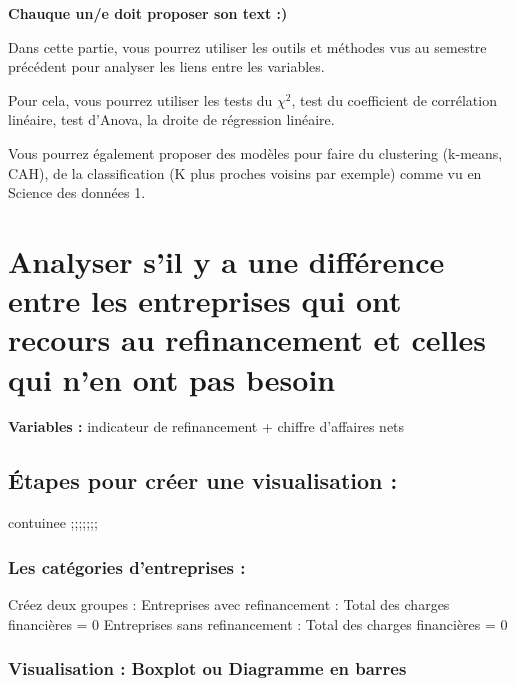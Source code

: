 \documentclass[mstat,12pt]{unswthesis}
\begin{document}
\textbf{Chauque un/e doit proposer son text :) }

Dans cette partie, vous pourrez utiliser les outils et méthodes vus au
semestre précédent pour analyser les liens entre les variables.

Pour cela, vous pourrez utiliser les tests du \(\chi^2\), test du
coefficient de corrélation linéaire, test d'Anova, la droite de
régression linéaire.

Vous pourrez également proposer des modèles pour faire du clustering
(k-means, CAH), de la classification (K plus proches voisins par
exemple) comme vu en Science des données 1.

\newpage

\section{\texorpdfstring{\textbf{Analyser s'il y a une différence entre
les entreprises qui ont recours au refinancement et celles qui n'en ont
pas
besoin}}{Analyser s'il y a une différence entre les entreprises qui ont recours au refinancement et celles qui n'en ont pas besoin}}\label{analyser-sil-y-a-une-diffuxe9rence-entre-les-entreprises-qui-ont-recours-au-refinancement-et-celles-qui-nen-ont-pas-besoin}

\bigskip

\textbf{Variables :} indicateur de refinancement + chiffre d'affaires
nets

\subsection{Étapes pour créer une visualisation
:}\label{uxe9tapes-pour-cruxe9er-une-visualisation-1}

contuinee ;;;;;;;

\subsubsection{Les catégories d'entreprises
:}\label{les-catuxe9gories-dentreprises-1}

\bigskip

Créez deux groupes : Entreprises avec refinancement : Total des charges
financières = 0 Entreprises sans refinancement : Total des charges
financières = 0

\subsubsection{Visualisation : Boxplot ou Diagramme en
barres}\label{visualisation-boxplot-ou-diagramme-en-barres-1}
\end{document}
